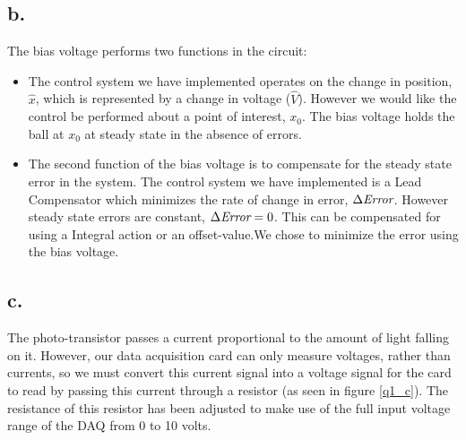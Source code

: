 \documentclass{article}
\theoremstyle{plain}
\theoremstyle{definition}
\theoremstyle{remark}
\begin{document}
\subsection*{b.}
The bias voltage performs two functions in the circuit:
\begin{itemize}
\item The control system we have implemented operates on the change in position, $\hat{x}$, which is represented by a change in voltage ($\hat{V}$). However we would like the control be performed about a point of interest, $x_0$. The bias voltage holds the ball at $x_0$ at steady state in the absence of errors.

\item The second function of the bias voltage is to compensate for the steady state error in the system. The control system we have implemented is a Lead Compensator which minimizes the rate of change in error, $\Delta \emph{Error}$. However steady state errors are constant, $\Delta \emph{Error} = 0$. This can be compensated for using a Integral action or an offset-value.We chose to minimize the error using the bias voltage.
\end{itemize}

\subsection*{c.}
The photo-transistor passes a current proportional to the amount of light falling on it.  However, our data acquisition card can only measure voltages, rather than currents, so we must convert this current signal into a voltage signal for the card to read by passing this current through a resistor (as seen in figure \ref{q1_c}). The resistance of this resistor has been adjusted to make use of the full input voltage range of the DAQ from 0 to 10 volts.\\ 
\end{document}
